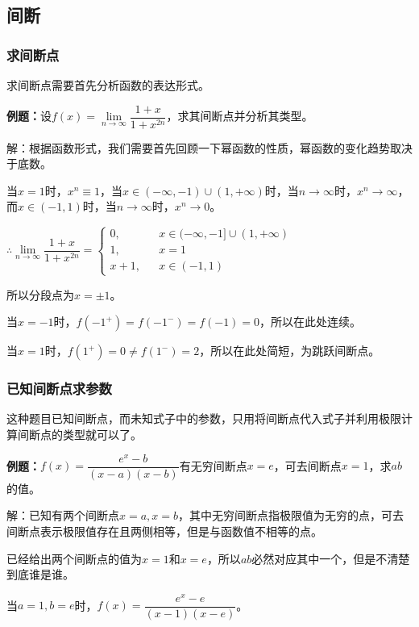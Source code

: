 \documentclass[UTF8, 12pt]{ctexart}
\begin{document}
\subsection{间断}

\subsubsection{求间断点}

求间断点需要首先分析函数的表达形式。

\textbf{例题：}设$f(x)=\lim\limits_{n\to\infty}\dfrac{1+x}{1+x^{2n}}$，求其间断点并分析其类型。

解：根据函数形式，我们需要首先回顾一下幂函数的性质，幂函数的变化趋势取决于底数。

当$x=1$时，$x^n\equiv 1$，当$x\in(-\infty,-1)\cup(1,+\infty)$时，当$n\to\infty$时，$x^n\to\infty$，而$x\in(-1,1)$时，当$n\to\infty$时，$x^n\to 0$。

$\therefore\lim\limits_{n\to\infty}\dfrac{1+x}{1+x^{2n}}=\left\{\begin{array}{lcl}
        0,   &  & x\in(-\infty,-1]\cup(1,+\infty) \\
        1,   &  & x=1                                        \\
        x+1, &  & x\in(-1,1)
    \end{array}
    \right.$

所以分段点为$x=\pm 1$。

当$x=-1$时，$f(-1^+)=f(-1^-)=f(-1)=0$，所以在此处连续。

当$x=1$时，$f(1^+)=0\neq f(1^-)=2$，所以在此处简短，为跳跃间断点。

\subsubsection{已知间断点求参数}

这种题目已知间断点，而未知式子中的参数，只用将间断点代入式子并利用极限计算间断点的类型就可以了。

\textbf{例题：}$f(x)=\dfrac{e^x-b}{(x-a)(x-b)}$有无穷间断点$x=e$，可去间断点$x=1$，求$ab$的值。

解：已知有两个间断点$x=a,x=b$，其中无穷间断点指极限值为无穷的点，可去间断点表示极限值存在且两侧相等，但是与函数值不相等的点。

已经给出两个间断点的值为$x=1$和$x=e$，所以$ab$必然对应其中一个，但是不清楚到底谁是谁。

当$a=1,b=e$时，$f(x)=\dfrac{e^x-e}{(x-1)(x-e)}$。\medskip
\end{document}
